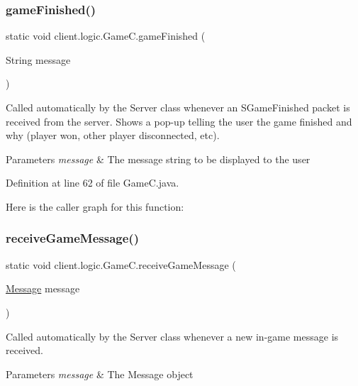 \subsubsection{\texorpdfstring{game\+Finished()}{gameFinished()}}
{\footnotesize\ttfamily static void client.\+logic.\+Game\+C.\+game\+Finished (\begin{DoxyParamCaption}\item[{String}]{message }\end{DoxyParamCaption})\hspace{0.3cm}{\ttfamily [static]}}

Called automatically by the {\ttfamily Server} class whenever an {\ttfamily S\+Game\+Finished} packet is received from the server. Shows a pop-\/up telling the user the game finished and why (player won, other player disconnected, etc).


\begin{DoxyParams}{Parameters}
{\em message} & The message string to be displayed to the user \\
\hline
\end{DoxyParams}


Definition at line 62 of file Game\+C.\+java.

Here is the caller graph for this function\+:
\hypertarget{classclient_1_1logic_1_1_game_c_a70979b2783537bb175c0a8926680e236}{}\label{classclient_1_1logic_1_1_game_c_a70979b2783537bb175c0a8926680e236} 
\subsubsection{\texorpdfstring{receive\+Game\+Message()}{receiveGameMessage()}}
{\footnotesize\ttfamily static void client.\+logic.\+Game\+C.\+receive\+Game\+Message (\begin{DoxyParamCaption}\item[{\hyperlink{classpt_1_1up_1_1fe_1_1lpro1613_1_1sharedlib_1_1tuples_1_1_message}{Message}}]{message }\end{DoxyParamCaption})\hspace{0.3cm}{\ttfamily [static]}}

Called automatically by the {\ttfamily Server} class whenever a new in-\/game message is received.


\begin{DoxyParams}{Parameters}
{\em message} & The Message object \\
\hline
\end{DoxyParams}


